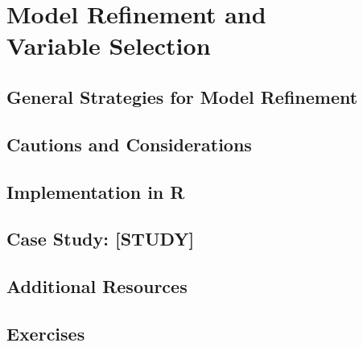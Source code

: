 
\chapter{Model Refinement and\\ Variable Selection}

\section{General Strategies for Model Refinement}

\section{Cautions and Considerations}

\section{Implementation in R}

\section{Case Study: [STUDY]}

\section{Additional Resources}

\section{Exercises}